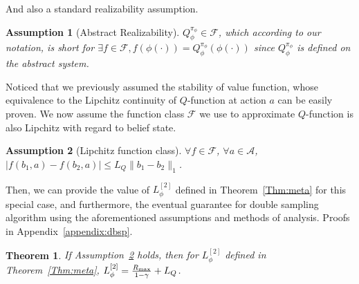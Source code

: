\documentclass[twoside]{article}
\newtheorem{theorem}{Theorem}
\newtheorem{assumption}{Assumption}
\newtheorem{remark}{Remark}
\newcommand{\CAL}[1]{\mathcal{#1}}
\begin{document}
And also a standard realizability assumption.
\begin{assumption}[Abstract Realizability]\label{asmp:realizability}
$Q^{\pi_\phi}_\phi \in \CAL{F}$, which according to our notation, is short for $\exists f\in\CAL{F}, f(\phi(\cdot))=Q^{\pi_\phi}_\phi(\phi(\cdot))$ since $Q^{\pi_\phi}_\phi$ is defined on the abstract system.
\end{assumption}






Noticed that we previously assumed the stability of value function, whose equivalence to the Lipchitz continuity of $Q$-function at action $a$ can be easily proven. We now assume the function class $\mathcal{F}$ we use to approximate $Q$-function is also Lipchitz with regard to belief state.
\begin{assumption}[Lipchitz function class]\label{asm:lipchitz_function_class}
 $\forall f\in\mathcal{F}$, $\forall a\in\mathcal{A}$, $|f(b_1,a)-f(b_2,a)|\leq L_Q\|b_1-b_2\|_1$.
\end{assumption}
Then, we can provide the value of $L_\phi^{[2]}$ defined in Theorem~\ref{Thm:meta} for this special case, and furthermore, the eventual guarantee for double sampling algorithm using the aforementioned assumptions and methods of analysis. Proofs in Appendix~\ref{appendix:dbsp}.
\begin{theorem}\label{Thm:db_sp_Lphi}
    If Assumption~\ref{asm:lipchitz_function_class} holds, then for $L_\phi^{[2]}$ defined in Theorem~\ref{Thm:meta}, $L_\phi^{[2]}=\frac{R_{\rm max}}{1-\gamma}+L_Q$.%
\end{theorem}

\end{document}
